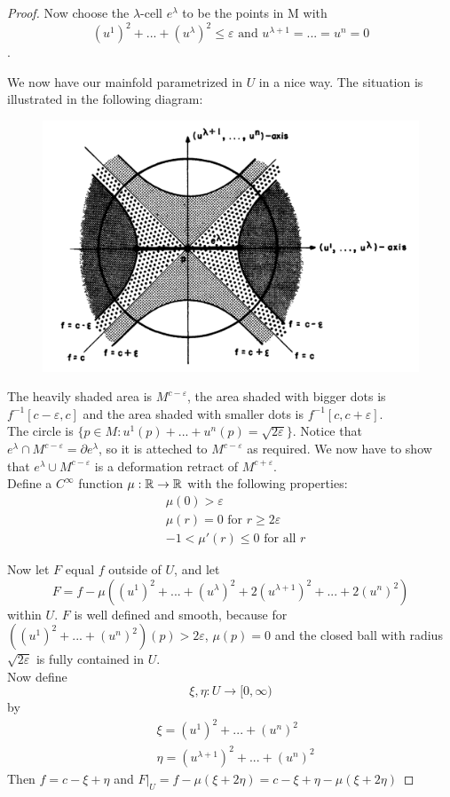 \begin{proof}
    Now choose the $\lambda$-cell $e^{\lambda}$ to be the points in M with
    \[ (u^1)^2 + ... + (u^{\lambda})^2 \leq \varepsilon 
    \text{ and } u^{\lambda + 1} = ... = u^n = 0 \].
 
    We now have our mainfold parametrized in $U$ in a nice way. The situation is
    illustrated in the following diagram:
 
    \begin{figure}[H]
       \centering
       \includegraphics[width=0.7\linewidth]{resources/Mil-Diagram5.png}
       \label{fig:mil-diagram5}
    \end{figure}
 
    The heavily shaded area is $M^{c-\varepsilon}$, the area shaded with bigger
    dots is $f^{-1}[c - \varepsilon, c]$ and the area shaded with smaller dots
    is $f^{-1}[c, c + \varepsilon]$. \\
    The circle is $\{ p \in M : u^1(p) + ... + u^n(p) = \sqrt{2\varepsilon} \}$.
    Notice that $e^\lambda \cap M^{c - \varepsilon} = \partial e^{\lambda}$, so
    it is atteched to $M^{c - \varepsilon}$ as required. We now have to show that
    $e^{\lambda} \cup M^{c - \varepsilon}$ is a deformation retract of 
    $M^{c + \varepsilon}$. \\
    Define a $C^{\infty}$ function $\mu : {\mathbb R} \rightarrow {\mathbb R}$ with the following
    properties:
    \begin{align*}
       & \mu(0) > \varepsilon \\
       & \mu(r) = 0 \text{ for } r \geq 2\varepsilon \\
       & -1 < \mu'(r) \leq 0 \text{ for all } r
    \end{align*}
 
    Now let $F$ equal $f$ outside of $U$, and let 
    \[ F = f - \mu((u^1)^2 + ... + (u^{\lambda})^2 + 2(u^{\lambda + 1})^2 + ... + 2(u^n)^2) \]
    within $U$. $F$ is well defined and smooth, because for 
    $ ((u^1)^2 + ... + (u^n)^2)(p) > 2\varepsilon $, $\mu(p) = 0$ and the closed
    ball with radius $\sqrt{2\varepsilon}$ is fully contained in $U$. \\
    Now define 
    \[ \xi, \eta: U \rightarrow [0, \infty) \]
    by
    \begin{align*}
       & \xi = (u^1)^2 + ... + (u^n)^2 \\
       & \eta = (u^{\lambda + 1})^2 + ... + (u^n)^2
    \end{align*}
    Then $f = c - \xi + \eta$ and $F|_U = f - \mu(\xi + 2\eta) = c - \xi + \eta - \mu(\xi + 2\eta)$
 

\end{proof}
